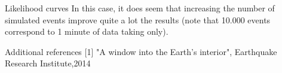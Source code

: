 \documentclass[8 pt]{beamer}
\newcommand{\backupend}{
   \setcounter{framenumber}{\value{finalframe}}
}
\begin{document}
\begin{frame}{Likelihood curves}
In this case, it does seem that increasing the number of simulated events improve quite a lot the results (note that 10.000 events correspond to 1 minute of data taking only). \vfill
\end{frame}

\begin{frame}{Additional references}
[1] "A window into the Earth’s interior", Earthquake Research Institute,2014
\end{frame}

\backupend


 
\end{document}
